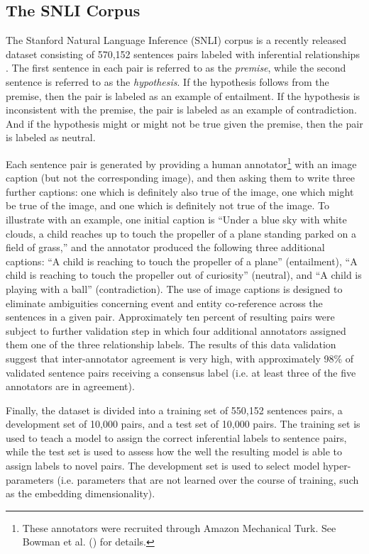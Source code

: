 \subsection{The SNLI Corpus}

The Stanford Natural Language Inference (SNLI) corpus is a recently released dataset consisting of 570,152 sentences pairs labeled with inferential relationships \citep{Bowman:2015}. The first sentence in each pair is referred to as the \textit{premise}, while the second sentence is referred to as the \textit{hypothesis}. If the hypothesis follows from the premise, then the pair is labeled as an example of entailment. If the hypothesis is inconsistent with the premise, the pair is labeled as an example of contradiction. And if the hypothesis might or might not be true given the premise, then the pair is labeled as neutral.

Each sentence pair is generated by providing a human annotator\footnote{These annotators were recruited through Amazon Mechanical Turk. See Bowman et al. (\citeyear{Bowman:2015}) for details.} with an image caption (but not the corresponding image), and then asking them to write three further captions: one which is definitely also true of the image, one which might be true of the image, and one which is definitely not true of the image. To illustrate with an example, one initial caption is ``Under a blue sky with white clouds, a child reaches up to touch the propeller of a plane standing parked on a field of grass,'' and the annotator produced the following three additional captions: ``A child is reaching to touch the propeller of a plane'' (entailment), ``A child is reaching to touch the propeller out of curiosity'' (neutral), and ``A child is playing with a ball'' (contradiction). The use of image captions is designed to eliminate ambiguities concerning event and entity co-reference across the sentences in a given pair. Approximately ten percent of resulting pairs were subject to further validation step in which four additional annotators assigned them one of the three relationship labels. The results of this data validation suggest that inter-annotator agreement is very high, with approximately 98\% of validated sentence pairs receiving a consensus label (i.e. at least three of the five annotators are in agreement). 

Finally, the dataset is divided into a training set of 550,152 sentences pairs, a development set of 10,000 pairs, and a test set of 10,000 pairs. The training set is used to teach a model to assign the correct inferential labels to sentence pairs, while the test set is used to assess how the well the resulting model is able to assign labels to novel pairs. The development set is used to select model hyper-parameters (i.e. parameters that are not learned over the course of training, such as the embedding dimensionality). 

